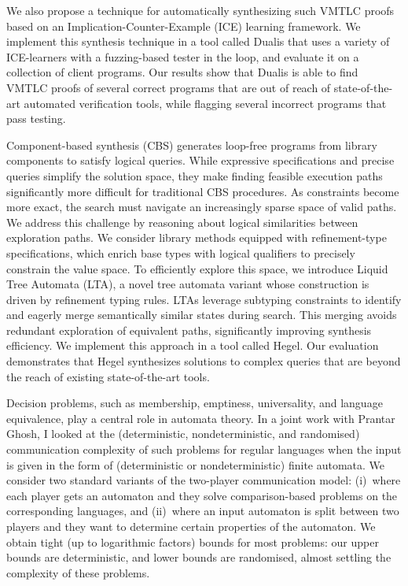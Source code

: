 \documentclass[a4paper,UKenglish]{dagrep-v2021}
\begin{document}
We also propose a technique for automatically synthesizing such VMTLC proofs based on an Implication-Counter-Example (ICE) learning framework. We implement this synthesis technique in a tool called Dualis that uses a variety of ICE-learners with a fuzzing-based tester in the loop, and evaluate it on a collection of client programs. Our results show that Dualis is able to find VMTLC proofs of several correct programs that are out of reach of state-of-the-art automated verification tools, while flagging several incorrect programs that pass testing.


Component-based synthesis (CBS) generates loop-free programs from library components to satisfy logical queries. While expressive specifications and precise queries simplify the solution space, they make finding feasible execution paths significantly more difficult for traditional CBS procedures. As constraints become more exact, the search must navigate an increasingly sparse space of valid paths. We address this challenge by reasoning about logical similarities between exploration paths. We consider library methods equipped with refinement-type specifications, which enrich base types with logical qualifiers to precisely constrain the value space. To efficiently explore this space, we introduce Liquid Tree Automata (LTA), a novel tree automata variant whose construction is driven by refinement typing rules. LTAs leverage subtyping constraints to identify and eagerly merge semantically similar states during search. This merging avoids redundant exploration of equivalent paths, significantly improving synthesis efficiency. We implement this approach in a tool called Hegel. Our evaluation demonstrates that Hegel synthesizes solutions to complex queries that are beyond the reach of existing state-of-the-art tools.


Decision problems, such as membership, emptiness, universality, and language equivalence, play a central role in automata theory. In a joint work with Prantar Ghosh, I looked at the (deterministic, nondeterministic, and randomised) communication complexity of such problems for regular languages when the input is given in the form of (deterministic or nondeterministic) finite automata. We consider two standard variants of the two-player communication model: (i)~where each player gets an automaton and they solve comparison-based problems on the corresponding languages, and (ii)~where an input automaton is split between two players and they want to determine certain properties of the automaton. We obtain tight (up to logarithmic factors) bounds for most problems: our upper bounds are deterministic, and lower bounds are randomised, almost settling the complexity of these problems.
\end{document}
